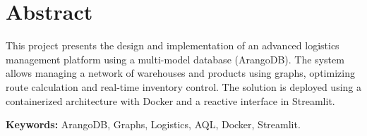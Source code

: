 \chapter*{Abstract}
This project presents the design and implementation of an advanced logistics management platform using a multi-model database (ArangoDB). The system allows managing a network of warehouses and products using graphs, optimizing route calculation and real-time inventory control. The solution is deployed using a containerized architecture with Docker and a reactive interface in Streamlit.

\vspace{.5cm}

\textbf{Keywords:} ArangoDB, Graphs, Logistics, AQL, Docker, Streamlit.